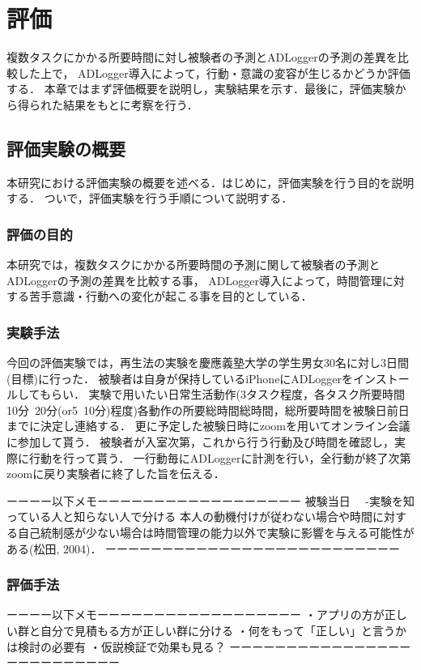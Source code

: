 \chapter{評価}
複数タスクにかかる所要時間に対し被験者の予測とADLoggerの予測の差異を比較した上で，
ADLogger導入によって，行動・意識の変容が生じるかどうか評価する．
本章ではまず評価概要を説明し，実験結果を示す．最後に，評価実験から得られた結果をもとに考察を行う．

\section{評価実験の概要}
本研究における評価実験の概要を述べる．はじめに，評価実験を行う目的を説明する．
ついで，評価実験を行う手順について説明する．

\subsection{評価の目的}
本研究では，複数タスクにかかる所要時間の予測に関して被験者の予測とADLoggerの予測の差異を比較する事，
ADLogger導入によって，時間管理に対する苦手意識・行動への変化が起こる事を目的としている．

\subsection{実験手法}%
今回の評価実験では，再生法\cite{Oguro1961}\cite{Tayama2018}の実験を慶應義塾大学の学生男女30名に対し3日間(目標)に行った．
被験者は自身が保持しているiPhoneにADLoggerをインストールしてもらい．
実験で用いたい日常生活動作(3タスク程度，各タスク所要時間10分~20分(or5~10分)程度)各動作の所要総時間総時間，総所要時間を被験日前日までに決定し連絡する．
更に予定した被験日時にzoom\cite{zoom}を用いてオンライン会議に参加して貰う．
被験者が入室次第，これから行う行動及び時間を確認し，実際に行動を行って貰う．
一行動毎にADLoggerに計測を行い，全行動が終了次第zoomに戻り実験者に終了した旨を伝える．

ーーーー以下メモーーーーーーーーーーーーーーーーーー
被験当日
　-実験を知っている人と知らない人で分ける
本人の動機付けが従わない場合や時間に対する自己統制感が少ない場合は時間管理の能力以外で実験に影響を与える可能性がある(松田, 2004)．
ーーーーーーーーーーーーーーーーーーーーーーーーーー

\subsection{評価手法}
ーーーー以下メモーーーーーーーーーーーーーーーーーー
・アプリの方が正しい群と自分で見積もる方が正しい群に分ける
・何をもって「正しい」と言うかは検討の必要有
・仮説検証で効果も見る？
ーーーーーーーーーーーーーーーーーーーーーーーーーー

